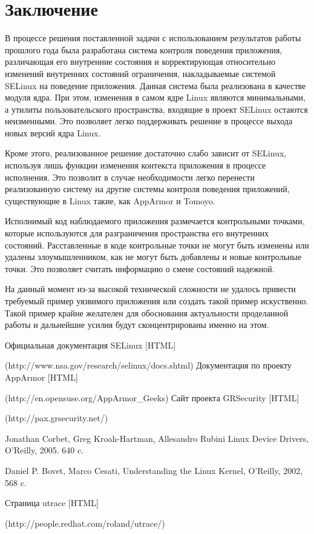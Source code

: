 \bigskip
\section {Заключение} 

В процессе решения поставленной задачи 
с использованием результатов работы прошлого 
года была разработана система контроля 
поведения приложения, различающая его 
внутренние состояния и корректирующая
относительно изменений внутренних состояний
ограничения, накладываемые системой SELinux
на поведение приложения. Данная система была 
реализована в качестве модуля ядра. При этом, 
изменения в самом ядре Linux являются минимальными, 
а утилиты пользовательского пространства, входящие
в проект SELinux остаются неизменными. Это позволяет 
легко поддерживать решение в процессе выхода новых 
версий ядра Linux. 

Кроме этого, реализованное решение достаточно 
слабо зависит от SELinux, используя лишь функции 
изменения контекста приложения в процессе исполнения.
Это позволит в случае необходимости легко 
перенести реализованную систему на другие системы 
контроля поведения приложений, существующие в Linux
такие, как AppArmor и Tomoyo.

Исполнимый код наблюдаемого приложения размечается 
контрольными точками, которые используются для 
разграничения пространства его внутренних состояний. 
Расставленные в коде контрольные точки не могут быть 
изменены или удалены злоумышленником, как не могут 
быть добавлены и новые контрольные точки. Это позволяет 
считать информацию о смене состояний надежной. 

На данный момент из-за высокой технической сложности 
не удалось привести требуемый пример уязвимого приложения 
или создать такой пример искуственно. Такой пример 
крайне желателен для обоснования актуальности проделанной
работы и дальнейшие усилия будут сконцентрированы именно 
на этом. 


\bigskip
\begin{thebibliography}{99}
Официальная документация SELinux [HTML] 

(http://www.nsa.gov/research/selinux/docs.shtml)
Документация по проекту AppArmor [HTML]

(http://en.opensuse.org/AppArmor\_Geeks)
Сайт проекта GRSecurity [HTML] 

(http://pax.grsecurity.net/)

Jonathan Corbet, Greg Kroah-Hartman, Allesandro Rubini Linux Device Drivers, O'Reilly, 2005. 640 c.

Daniel P. Bovet, Marco Cesati, Understanding the Linux Kernel, O'Reilly, 2002, 568 c.
 
Страница utrace [HTML] 

(http://people.redhat.com/roland/utrace/)

\end{thebibliography}
